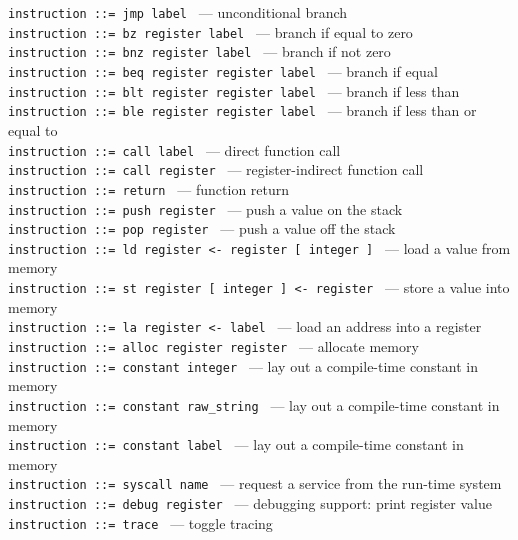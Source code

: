 \documentclass[]{article}
\begin{document}
\texttt{instruction ::= jmp label } --- unconditional branch\\
\texttt{instruction ::= bz register label } --- branch if equal to zero
\\ \texttt{instruction ::= bnz register label } --- branch if not zero
\\ \texttt{instruction ::= beq register register label } --- branch if
equal \\ \texttt{instruction ::= blt register register label } ---
branch if less than \\
\texttt{instruction ::= ble register register label } --- branch if less
than or equal to \\ \texttt{instruction ::= call label } --- direct
function call\\ \texttt{instruction ::= call register } ---
register-indirect function call\\ \texttt{instruction ::= return } ---
function return\\

\texttt{instruction ::= push register } --- push a value on the stack\\
\texttt{instruction ::= pop register } --- push a value off the stack\\
\texttt{instruction ::= ld register \textless{}- register {[} integer {]} }
--- load a value from memory \\
\texttt{instruction ::= st register {[} integer {]} \textless{}- register }
--- store a value into memory \\
\texttt{instruction ::= la register \textless{}- label } --- load an
address into a register \\

\texttt{instruction ::= alloc register register } --- allocate memory\\
\texttt{instruction ::= constant integer } --- lay out a compile-time
constant in memory\\ \texttt{instruction ::= constant raw\_string } ---
lay out a compile-time constant in memory\\
\texttt{instruction ::= constant label } --- lay out a compile-time
constant in memory\\

\texttt{instruction ::= syscall name } --- request a service from the
run-time system\\

\texttt{instruction ::= debug register } --- debugging support: print
register value \\ \texttt{instruction ::= trace } --- toggle tracing \\
\end{document}
